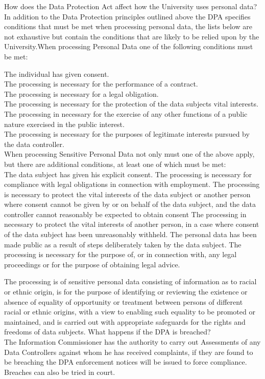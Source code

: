 \documentclass[12pt]{article}
\begin{document}
How does the Data Protection Act affect how the University uses personal data?
In addition to the Data Protection principles outlined above the DPA specifies conditions that must be met when processing personal data, the lists below are not exhaustive but contain the conditions that are likely to be relied upon by the University.When processing Personal Data one of the following conditions must be met:

The individual has given consent.\\
The processing is necessary for the performance of a contract.\\
The processing is necessary for a legal obligation.\\
The processing is necessary for the protection of the data subjects vital interests.\\
The processing in necessary for the exercise of any other functions of a public nature exercised in the public interest.\\
The processing is necessary for the purposes of legitimate interests pursued by the data controller.\\
When processing Sensitive Personal Data not only must one of the above apply, but there are additional conditions, at least one of which must be met:\\

The data subject has given his explicit consent.
The processing is necessary for compliance with legal obligations in connection with employment.
The processing is necessary to protect the vital interests of the data subject or another person where consent cannot be given by or on behalf of the data subject, and the data controller cannot reasonably be expected to obtain consent
The processing in necessary to protect the vital interests of another person, in a case where consent of the data subject has been unreasonably withheld.
The personal data has been made public as a result of steps deliberately taken by the data subject.
The processing is necessary for the purpose of, or in connection with, any legal proceedings or for the purpose of obtaining legal advice.

The processing is of sensitive personal data consisting of information as to racial or ethnic origin, is for the purpose of identifying or reviewing the existence or absence of equality of opportunity or treatment between persons of different racial or ethnic origins, with a view to enabling such equality to be promoted or maintained, and is carried out with appropriate safeguards for the rights and freedoms of data subjects.
What happens if the DPA is breached?\\
The Information Commissioner has the authority to carry out Assessments of any Data Controllers against whom he has received complaints, if they are found to be breaching the DPA enforcement notices will be issued to force compliance. Breaches can also be tried in court.\\
\end{document}

